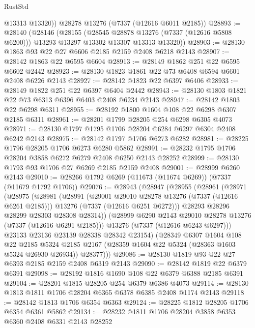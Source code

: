 \begin{lexlean}{RustStd}
\begin{coremodule}
        @13313
        @13320))
    @28278
    @13276
    (@7337 (@12616 @6011 @2185))
@28893 := @28140
    (@28146
      (@28155
        (@28545 @28878 @13276 (@7337 (@12616 @5808 @6200)))
        @13293
        @13297
        @13302
        @13307
        @13313
        @13320))
@28903 := @28130 @1863 @93 @22 @27 @6606 @2185 @2159 @2408 @6218 @2143
@28907 := @28142 @1863 @22 @6595 @6604
@28913 := @28149 @1862 @251 @22 @6595 @6602 @2442
@28923 := @28130 @1823 @1861 @22 @73 @6408 @6594 @6601 @2408 @6226 @2143
@28927 := @28142 @1823 @22 @6397 @6406
@28933 := @28149 @1822 @251 @22 @6397 @6404 @2442
@28943 := @28130 @1803 @1821 @22 @73 @6313 @6396 @6403 @2408 @6234 @2143
@28947 := @28142 @1803 @22 @6298 @6311
@28955 := @28192 @1800 @1604 @108 @22 @6298 @6307 @2185 @6311
@28961 := @28201 @1799 @28205 @254 @6298 @6305 @4073
@28971 := @28130 @1797 @1795 @1706 @28204 @6284 @6297 @6304 @2408 @6242 @2143
@28975 := @28142 @1797 @1706 @6273 @6282
@28981 := @28225 @1796 @28205 @1706 @6273 @6280 @5862
@28991 := @28232 @1795 @1706 @28204 @3858 @6272 @6279 @2408 @6250 @2143 @28252
@28999 := @28130 @1793 @93 @1706 @27 @6269 @2185 @2159 @2408
@29001 := @28999 @6260 @2143
@29010 := @28266 @1792 @6269 (@11673 (@11674 @6269)) (@7337 (@11679 @1792 @1706))
@29076 := @28943
    (@28947
      (@28955
        (@28961
          (@28971
            (@28975
              (@28981
                (@28991
                  (@29001 @29010 @28278 @13276 (@7337 (@12616 @6261 @2185)))
                  @13276
                  (@7337 (@12616 @6251 @6272)))
                @28293
                @28296
                @28299
                @28303
                @28308
                @28314))
            (@28999 @6290 @2143 @29010 @28278 @13276 (@7337 (@12616 @6291 @2185)))
            @13276
            (@7337 (@12616 @6243 @6297)))
          @23133
          @23136
          @23139
          @28338
          @28342
          @23154)
        (@28349
          @6307
          @1604
          @108
          @22
          @2185
          @5324
          @2185
          @2167
          (@28359 @1604 @22 @5324 (@28363 @1603 @5324 @26930 @26934))
          @28377)))
@29086 := @28130 @1819 @93 @22 @27 @6393 @2185 @2159 @2408 @6319 @2143
@29090 := @28142 @1819 @22 @6379 @6391
@29098 := @28192 @1816 @1690 @108 @22 @6379 @6388 @2185 @6391
@29104 := @28201 @1815 @28205 @254 @6379 @6386 @4073
@29114 := @28130 @1813 @1811 @1706 @28204 @6365 @6378 @6385 @2408 @1174 @2143
@29118 := @28142 @1813 @1706 @6354 @6363
@29124 := @28225 @1812 @28205 @1706 @6354 @6361 @5862
@29134 := @28232 @1811 @1706 @28204 @3858 @6353 @6360 @2408 @6331 @2143 @28252

\end{coremodule}
\end{lexlean}
